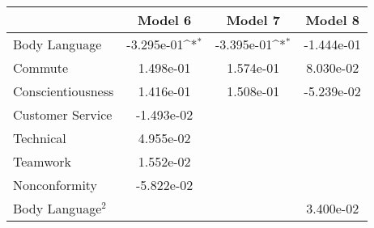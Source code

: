 {
\def\sym#1{\ifmmode^{#1}\else\(^{#1}\)\fi}
\begin{tabular}{l*{3}{c}}
    \toprule
                          & \multicolumn{1}{c}{Model 6} & \multicolumn{1}{c}{Model 7} & \multicolumn{1}{c}{Model 8} \\
    \midrule
    Body Language         & -3.295e-01\sym{*}           & -3.395e-01\sym{*}           & -1.444e-01                  \\
    \addlinespace
    Commute               & 1.498e-01                   & 1.574e-01                   & 8.030e-02                   \\
    \addlinespace
    Conscientiousness     & 1.416e-01                   & 1.508e-01                   & -5.239e-02                  \\
    \addlinespace
    Customer Service      & -1.493e-02                  &                             &                             \\
    \addlinespace
    Technical             & 4.955e-02                   &                             &                             \\
    \addlinespace
    Teamwork              & 1.552e-02                   &                             &                             \\
    \addlinespace
    Nonconformity         & -5.822e-02                  &                             &                             \\
    \addlinespace
    Body Language$^2$     &                             &                             & 3.400e-02                   \\

\end{tabular}}
